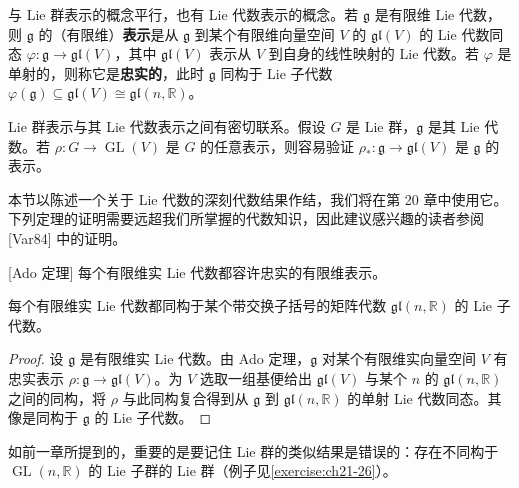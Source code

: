 \documentclass[../../main.tex]{subfiles}
\begin{document}
与 Lie 群表示的概念平行，也有 Lie 代数表示的概念。若 $\mathfrak{g}$ 是有限维 Lie 代数，则 $\mathfrak{g}$ 的（有限维）\textbf{表示}是从 $\mathfrak{g}$ 到某个有限维向量空间 $V$ 的 $\mathfrak{gl}(V)$ 的 Lie 代数同态 $\varphi\colon\mathfrak{g}\to\mathfrak{gl}(V)$，其中 $\mathfrak{gl}(V)$ 表示从 $V$ 到自身的线性映射的 Lie 代数。若 $\varphi$ 是单射的，则称它是\textbf{忠实的}，此时 $\mathfrak{g}$ 同构于 Lie 子代数 $\varphi(\mathfrak{g})\subseteq\mathfrak{gl}(V)\cong\mathfrak{gl}(n,\mathbb{R})$。

Lie 群表示与其 Lie 代数表示之间有密切联系。假设 $G$ 是 Lie 群，$\mathfrak{g}$ 是其 Lie 代数。若 $\rho\colon G\to\operatorname{GL}(V)$ 是 $G$ 的任意表示，则容易验证 $\rho_*\colon\mathfrak{g}\to\mathfrak{gl}(V)$ 是 $\mathfrak{g}$ 的表示。

本节以陈述一个关于 Lie 代数的深刻代数结果作结，我们将在第 20 章中使用它。下列定理的证明需要远超我们所掌握的代数知识，因此建议感兴趣的读者参阅 [Var84] 中的证明。

\begin{theorem}\label{theorem:ch08-49}[Ado 定理]
每个有限维实 Lie 代数都容许忠实的有限维表示。
\end{theorem}

\begin{corollary}\label{corollary:ch08-50}
每个有限维实 Lie 代数都同构于某个带交换子括号的矩阵代数 $\mathfrak{gl}(n,\mathbb{R})$ 的 Lie 子代数。
\end{corollary}

\begin{proof}
设 $\mathfrak{g}$ 是有限维实 Lie 代数。由 Ado 定理，$\mathfrak{g}$ 对某个有限维实向量空间 $V$ 有忠实表示 $\rho\colon\mathfrak{g}\to\mathfrak{gl}(V)$。为 $V$ 选取一组基便给出 $\mathfrak{gl}(V)$ 与某个 $n$ 的 $\mathfrak{gl}(n,\mathbb{R})$ 之间的同构，将 $\rho$ 与此同构复合得到从 $\mathfrak{g}$ 到 $\mathfrak{gl}(n,\mathbb{R})$ 的单射 Lie 代数同态。其像是同构于 $\mathfrak{g}$ 的 Lie 子代数。
\end{proof}

如前一章所提到的，重要的是要记住 Lie 群的类似结果是错误的：存在不同构于 $\operatorname{GL}(n,\mathbb{R})$ 的 Lie 子群的 Lie 群（例子见\cref{exercise:ch21-26}）。
\end{document}
